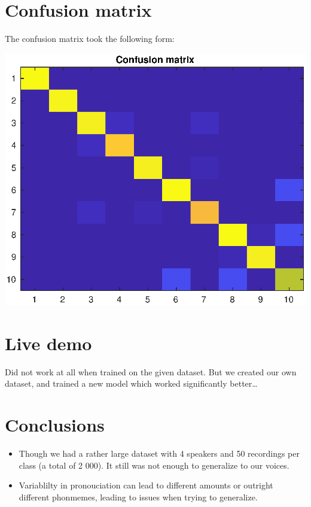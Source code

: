 \documentclass[]{article}
\let\origfigure\figure
\let\endorigfigure\endfigure
\renewenvironment{figure}[1][2] {
    \expandafter\origfigure\expandafter[H]
} {
    \endorigfigure
}
\begin{document}
\hypertarget{confusion-matrix}{%
\section{Confusion matrix}\label{confusion-matrix}}

The confusion matrix took the following form:

\begin{figure}
\centering
\includegraphics{../Results/confusionMatrix.eps}
\caption{Confusion matrix}
\end{figure}

\hypertarget{live-demo}{%
\section{Live demo}\label{live-demo}}

Did not work at all when trained on the given dataset. But we created
our own dataset, and trained a new model which worked significantly
better\ldots{}

\hypertarget{conclusions}{%
\section{Conclusions}\label{conclusions}}

\begin{itemize}
\item
  Though we had a rather large dataset with 4 speakers and 50 recordings
  per class (a total of 2 000). It still was not enough to generalize to
  our voices.
\item
  Variablilty in pronouciation can lead to different amounts or outright
  different phonmemes, leading to issues when trying to generalize.
\end{itemize}
\end{document}
